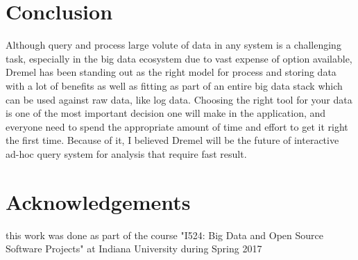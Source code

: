 \documentclass[9pt,twocolumn,twoside]{styles/osajnl}
\begin{document}
\section{Conclusion}
 Although query and process large volute of data in any system is a challenging task, especially in the big data ecosystem due to vast expense of option available, Dremel has been standing out as the right model for process and storing data with a lot of benefits as well as fitting as part of an entire big data stack which can be used against raw data, like log data.  Choosing the right tool for your data is one of the most important decision one will make in the application, and everyone need to spend the appropriate amount of time and effort to get it right the first time. Because of it,  I believed Dremel will be the future of interactive ad-hoc query system for analysis that require fast result. 
 
 \section{Acknowledgements}
this work was done as part of the course "I524: Big Data and Open Source Software Projects" at Indiana University during Spring 2017




 
\end{document}
